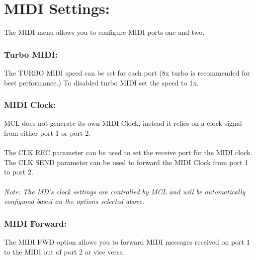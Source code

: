\chapter{MIDI Settings:}
The MIDI menu allows you to configure MIDI ports one and two.\\
\subsection{Turbo MIDI:}
The TURBO MIDI speed can be set for each port (8x turbo is recommended for best performance.) To disabled turbo MIDI set the speed to 1x.
\subsection{MIDI Clock:}
MCL does not generate its own MIDI Clock, instead it relies on a clock signal from either port 1 or port 2.\\\\
The CLK REC parameter can be used to set the receive port for the MIDI clock.\\
The CLK SEND parameter can be used to forward the MIDI Clock from port 1 to port 2.\\\\
\textit{Note: The MD's clock settings are controlled by MCL and will be automatically configured based on the options selected above.}

\subsection{MIDI Forward:}
The MIDI FWD option allows you to forward MIDI messages received on port 1 to the MIDI out of port 2 or vice versa.

